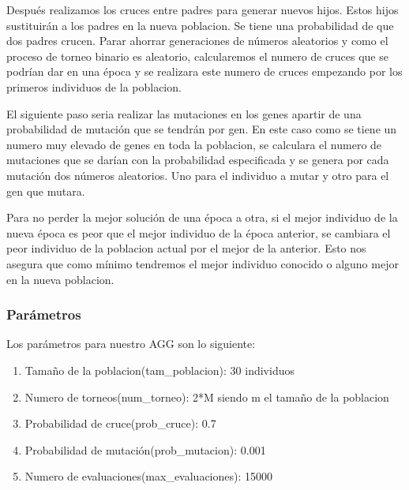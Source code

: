 \documentclass[titlepage]{article}
\begin{document}
	Después realizamos los cruces entre padres para generar nuevos hijos. Estos hijos sustituirán a los padres en la nueva poblacion. Se tiene una probabilidad de que dos padres crucen. Parar ahorrar generaciones de números aleatorios y como el proceso de torneo binario es aleatorio, calcularemos el numero de cruces que se podrían dar en una época y se realizara este numero de cruces empezando por los primeros individuos de la poblacion. 
	
	El siguiente paso seria realizar las mutaciones en los genes apartir de una probabilidad de mutación que se tendrán por gen. En este caso como se tiene un numero muy elevado de genes en toda la poblacion, se calculara el numero de mutaciones que se darían con la probabilidad especificada y se genera por cada mutación dos números aleatorios. Uno para el individuo a mutar y otro para el gen que mutara. 
	
	Para no perder la mejor solución de una época a otra, si el mejor individuo de la nueva época es peor que el mejor individuo de la época anterior, se cambiara el peor individuo de la poblacion actual por el mejor de la anterior. Esto nos asegura que como mínimo tendremos el mejor individuo conocido o alguno mejor en la nueva poblacion.
	\subsubsection{Parámetros}
	Los parámetros para nuestro AGG son lo siguiente:
	\begin{enumerate}
		\item Tamaño de la poblacion(tam\_poblacion): 30 individuos
		\item Numero de torneos(num\_torneo): 2*M siendo m el tamaño de la poblacion
		\item Probabilidad de cruce(prob\_cruce): 0.7
		\item Probabilidad de mutación(prob\_mutacion): 0.001
		\item Numero de evaluaciones(max\_evaluaciones): 15000
	\end{enumerate}
	\newpage
\end{document}
